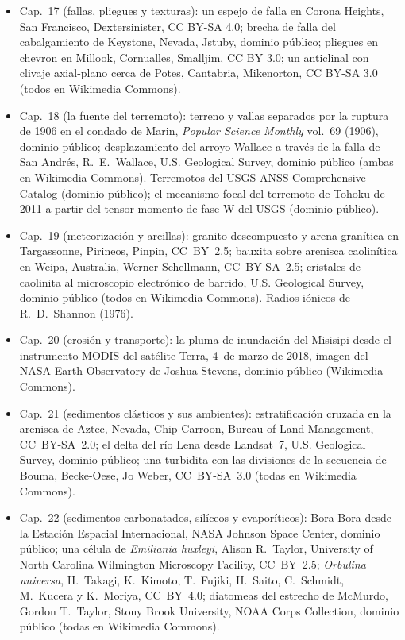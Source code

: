\begin{itemize}
  \item Cap.~17 (fallas, pliegues y texturas): un espejo de falla en Corona Heights, San Francisco, Dextersinister, CC BY-SA 4.0; brecha de falla del cabalgamiento de Keystone, Nevada, Jstuby, dominio público; pliegues en chevron en Millook, Cornualles, Smalljim, CC BY 3.0; un anticlinal con clivaje axial-plano cerca de Potes, Cantabria, Mikenorton, CC BY-SA 3.0 (todos en Wikimedia Commons).
  \item Cap.~18 (la fuente del terremoto): terreno y vallas separados por la ruptura de 1906 en el condado de Marin, \emph{Popular Science Monthly} vol.~69 (1906), dominio público; desplazamiento del arroyo Wallace a través de la falla de San Andrés, R.~E.~Wallace, U.S. Geological Survey, dominio público (ambas en Wikimedia Commons). Terremotos del USGS ANSS Comprehensive Catalog (dominio público); el mecanismo focal del terremoto de Tohoku de 2011 a partir del tensor momento de fase W del USGS (dominio público).
  \item Cap.~19 (meteorización y arcillas): granito descompuesto y arena granítica en Targassonne, Pirineos, Pinpin, CC~BY~2.5; bauxita sobre arenisca caolinítica en Weipa, Australia, Werner Schellmann, CC~BY-SA~2.5; cristales de caolinita al microscopio electrónico de barrido, U.S. Geological Survey, dominio público (todos en Wikimedia Commons). Radios iónicos de R.~D.~Shannon (1976).
  \item Cap.~20 (erosión y transporte): la pluma de inundación del Misisipi desde el instrumento MODIS del satélite Terra, 4~de marzo de 2018, imagen del NASA Earth Observatory de Joshua Stevens, dominio público (Wikimedia Commons).
  \item Cap.~21 (sedimentos clásticos y sus ambientes): estratificación cruzada en la arenisca de Aztec, Nevada, Chip Carroon, Bureau of Land Management, CC~BY-SA~2.0; el delta del río Lena desde Landsat~7, U.S. Geological Survey, dominio público; una turbidita con las divisiones de la secuencia de Bouma, Becke-Oese, Jo Weber, CC~BY-SA~3.0 (todas en Wikimedia Commons).
  \item Cap.~22 (sedimentos carbonatados, silíceos y evaporíticos): Bora Bora desde la Estación Espacial Internacional, NASA Johnson Space Center, dominio público; una célula de \emph{Emiliania huxleyi}, Alison R.~Taylor, University of North Carolina Wilmington Microscopy Facility, CC~BY~2.5; \emph{Orbulina universa}, H.~Takagi, K.~Kimoto, T.~Fujiki, H.~Saito, C.~Schmidt, M.~Kucera y K.~Moriya, CC~BY~4.0; diatomeas del estrecho de McMurdo, Gordon T.~Taylor, Stony Brook University, NOAA Corps Collection, dominio público (todas en Wikimedia Commons).

\end{itemize}
